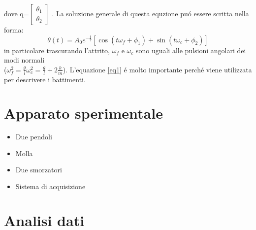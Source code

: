 \documentclass{exam}
\begin{document}
		dove q=$
		\begin{bmatrix}
			\theta_1 \\
			\theta_2
		\end{bmatrix}$
		. La soluzione generale di questa equzione pu\'o essere scritta nella forma:
		\begin{equation}
			\label{eq1}
			\theta(t)= A_0 e^{-\frac{t}{\tau}}[\cos(t\omega_f + \phi_1) +\sin(t\omega_c + \phi_2) ]
		\end{equation}
		in particolare trascurando l'attrito, $\omega_f$ e $\omega_c$ sono uguali alle pulsioni angolari dei modi normali\\($\omega_{f}^2=\frac{g}{l} \omega_{c}^2=\frac{g}{l}+2\frac{k}{m} $). L'equazione \ref{eq1} \'e molto importante perch\'e viene utilizzata per descrivere i battimenti.

	\section{Apparato sperimentale}
		\begin{itemize}
			\item Due pendoli
			\item Molla
			\item Due smorzatori
			\item Sistema di acquisizione
		\end{itemize}

	\section{Analisi dati}
\end{document}
